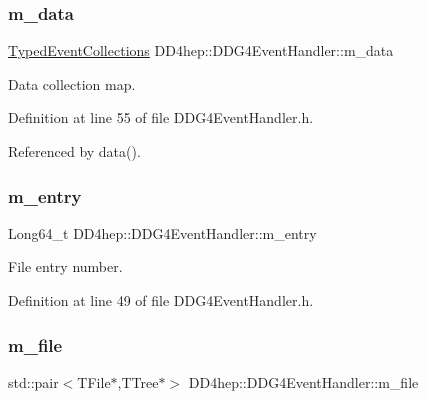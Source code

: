 \subsubsection{\texorpdfstring{m\+\_\+data}{m\_data}}
{\footnotesize\ttfamily \hyperlink{class_d_d4hep_1_1_event_handler_a4d441ff8a824b1e2f278e8b7a6391af3}{Typed\+Event\+Collections} D\+D4hep\+::\+D\+D\+G4\+Event\+Handler\+::m\+\_\+data\hspace{0.3cm}{\ttfamily [protected]}}



Data collection map. 



Definition at line 55 of file D\+D\+G4\+Event\+Handler.\+h.



Referenced by data().

\hypertarget{class_d_d4hep_1_1_d_d_g4_event_handler_ab28e33c8789d149c104fea42e39ba060}{}\label{class_d_d4hep_1_1_d_d_g4_event_handler_ab28e33c8789d149c104fea42e39ba060} 
\subsubsection{\texorpdfstring{m\+\_\+entry}{m\_entry}}
{\footnotesize\ttfamily Long64\+\_\+t D\+D4hep\+::\+D\+D\+G4\+Event\+Handler\+::m\+\_\+entry\hspace{0.3cm}{\ttfamily [protected]}}



File entry number. 



Definition at line 49 of file D\+D\+G4\+Event\+Handler.\+h.

\hypertarget{class_d_d4hep_1_1_d_d_g4_event_handler_a0b53d1d20cca9b02b9f119c99832b503}{}\label{class_d_d4hep_1_1_d_d_g4_event_handler_a0b53d1d20cca9b02b9f119c99832b503} 
\subsubsection{\texorpdfstring{m\+\_\+file}{m\_file}}
{\footnotesize\ttfamily std\+::pair$<$T\+File$\ast$,T\+Tree$\ast$$>$ D\+D4hep\+::\+D\+D\+G4\+Event\+Handler\+::m\+\_\+file\hspace{0.3cm}{\ttfamily [protected]}}



